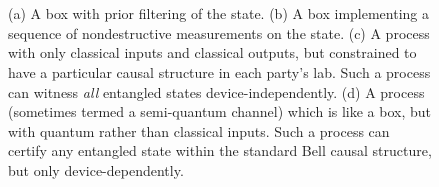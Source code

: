 \documentclass[12pt]{article}
\theoremstyle{plain}
\theoremstyle{definition}
\begin{document}
 
\begin{figure}[htb]
\centering
   \hspace{1.3em} \\
    \\
    \caption{
(a) A box with prior filtering of the state. 
(b) A box implementing a sequence of nondestructive measurements on the state.     (c) A process with only classical inputs and classical outputs, but constrained to have a particular causal structure in each party's lab.  Such a process can witness {\em all} entangled states device-independently. (d) A process (sometimes termed a semi-quantum channel) which is like a box, but with quantum rather than classical inputs.  Such a process can certify any entangled state within the standard Bell causal structure, but only device-dependently.}
     \label{fig:filtering_sequences_etc}
\end{figure}
\end{document}
